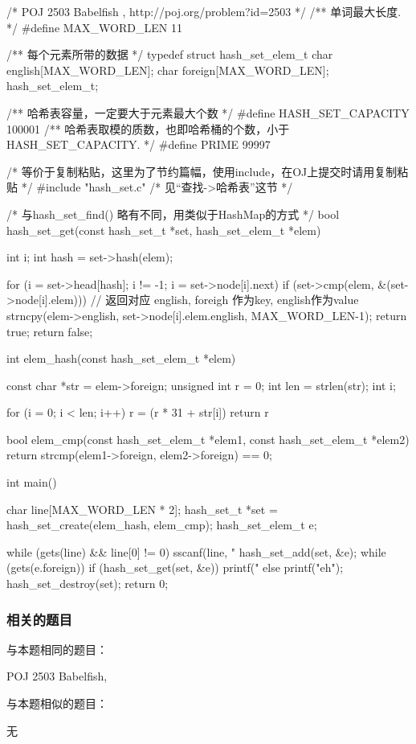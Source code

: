 \begin{Codex}[label=babelfish.c]
/* POJ 2503 Babelfish , http://poj.org/problem?id=2503 */
/** 单词最大长度. */
#define MAX_WORD_LEN   11

/** 每个元素所带的数据 */
typedef struct hash_set_elem_t {
    char english[MAX_WORD_LEN];
    char foreign[MAX_WORD_LEN];
} hash_set_elem_t;

/** 哈希表容量，一定要大于元素最大个数  */
#define HASH_SET_CAPACITY  100001
/** 哈希表取模的质数，也即哈希桶的个数，小于 HASH_SET_CAPACITY. */
#define PRIME  99997

/* 等价于复制粘贴，这里为了节约篇幅，使用include，在OJ上提交时请用复制粘贴 */
#include "hash_set.c"  /* 见“查找->哈希表”这节 */

/* 与hash_set_find() 略有不同，用类似于HashMap的方式 */
bool hash_set_get(const hash_set_t *set, hash_set_elem_t *elem) {
    int i;
    int hash = set->hash(elem);

    for (i = set->head[hash]; i != -1; i = set->node[i].next) {
        if (set->cmp(elem, &(set->node[i].elem))) {
            // 返回对应 english, foreigh 作为key, english作为value
            strncpy(elem->english, set->node[i].elem.english, MAX_WORD_LEN-1);
            return true;
        }
    }
    return false;
}

int elem_hash(const hash_set_elem_t *elem) {
    const char *str = elem->foreign;
    unsigned int r = 0;
    int len = strlen(str);
    int i;

    for (i = 0; i < len; i++) {
        r = (r * 31 + str[i]) %
    }
    return r %
}

bool elem_cmp(const hash_set_elem_t *elem1, const hash_set_elem_t *elem2) {
    return strcmp(elem1->foreign, elem2->foreign) == 0;
}

int main() {
    char line[MAX_WORD_LEN * 2];
    hash_set_t *set = hash_set_create(elem_hash, elem_cmp);
    hash_set_elem_t e;

    while (gets(line) && line[0] != 0) {
        sscanf(line, "%
        hash_set_add(set, &e);
    }
    while (gets(e.foreign)) {
        if (hash_set_get(set, &e)) printf("%
        else printf("eh\n");
    }
    hash_set_destroy(set);
    return 0;
}
\end{Codex}


\subsubsection{相关的题目}
与本题相同的题目：
\begindot
\item POJ 2503 Babelfish, 
\myenddot

与本题相似的题目：
\begindot
\item  无
\myenddot
